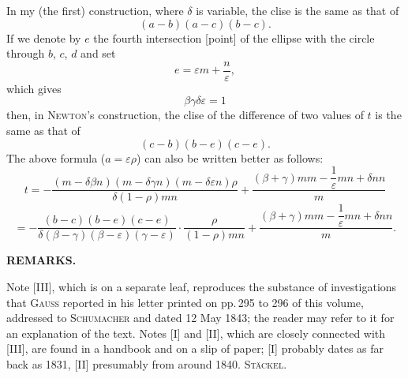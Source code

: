 In my (the first) construction, where $\delta$ is variable, the clise is the same as that of
\[
(a-b)(a-c)(b-c).
\]
If we denote by $e$ the fourth intersection [point] of the ellipse with the circle through $b$, $c$, $d$ and set
\[
e = \varepsilon m + \frac{n}{\varepsilon},
\]
which gives
\[
\beta\gamma\delta\varepsilon = 1
\]
then, in \textsc{Newton}'s construction, the clise of the difference of two values of $t$ is the same as that of
\[
(c-b)(b-e)(c-e).
\]
The above formula ($a=\varepsilon\rho$) can also be written better as follows:
\[
t = -\frac{(m-\delta\beta n)(m-\delta\gamma n)(m-\delta\varepsilon n)\rho}{\delta(1-\rho)mn} + \frac{(\beta+\gamma)mm-\dfrac{1}{\varepsilon}mn+\delta nn}{m}
\]
\[
= -\frac{(b-c)(b-e)(c-e)}{\delta(\beta-\gamma)(\beta-\varepsilon)(\gamma-\varepsilon)}\cdot\frac{\rho}{(1-\rho)mn} + \frac{(\beta+\gamma)mm-\dfrac{1}{\varepsilon}mn+\delta nn}{m}.
\]

\begin{center}\textbf{REMARKS.}\end{center}

Note [III], which is on a separate leaf, reproduces the substance of investigations that \textsc{Gauss} reported in his letter printed on pp.\,295 to 296 of this volume, addressed to \textsc{Schumacher} and dated 12 May 1843; the reader may refer to it for an explanation of the text. Notes [I] and [II], which are closely connected with [III], are found in a handbook and on a slip of paper; [I] probably dates as far back as 1831, [II] presumably from around 1840.
\hfill \textsc{Stäckel}.
